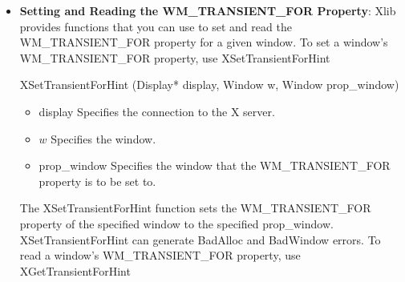 \documentclass{report}
\begin{document}
\begin{itemize}
\begin{itemize}
\begin{cppcode}
            Status XGetClassHint(Display* display, Window w, XClassHint* class_hints_return)
            \end{cppcode}
            \begin{itemize}
                \item display Specifies the connection to the X server.
                \item $w$ Specifies the window.
                \item class\_hints\_return Returns the XClassHint structure.
            \end{itemize}
            The XGetClassHint function returns the class hint of the specified window to the members of the supplied structure. If the data returned by the server is in the Latin Portable Character Encoding, then the returned strings are in the Host Portable Character Encoding. Otherwise, the result is implementation-dependent. It returns a nonzero status on success; otherwise, it returns a zero status. To free res\_name and res\_class when finished with the strings, use XFree on each individually.
            \bigbreak \noindent 
            XGetClassHint can generate a BadWindow error.
        \item \textbf{Setting and Reading the WM\_TRANSIENT\_FOR Property}: Xlib provides functions that you can use to set and read the WM\_TRANSIENT\_FOR property for a given window.
            \bigbreak \noindent 
            To set a window’s WM\_TRANSIENT\_FOR property, use XSetTransientForHint
            \bigbreak \noindent 
            \begin{cppcode}
            XSetTransientForHint (Display* display, Window w, Window prop_window)
            \end{cppcode}
            \begin{itemize}
                \item display Specifies the connection to the X server.
                \item $w$ Specifies the window.
                \item prop\_window Specifies the window that the WM\_TRANSIENT\_FOR property is to be set to.
            \end{itemize}
            The XSetTransientForHint function sets the WM\_TRANSIENT\_FOR property of the specified window to the specified prop\_window.
            \bigbreak \noindent 
            XSetTransientForHint can generate BadAlloc and BadWindow errors.
            \bigbreak \noindent 
            To read a window’s WM\_TRANSIENT\_FOR property, use XGetTransientForHint

\end{itemize}
\end{itemize}
\end{document}
